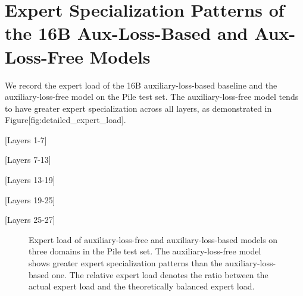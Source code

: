 \documentclass[11pt,a4paper]{article}
\begin{document}
\section{Expert Specialization Patterns of the 16B Aux-Loss-Based and Aux-Loss-Free Models}

We record the expert load of the 16B auxiliary-loss-based baseline and the auxiliary-loss-free model on the Pile test set. The auxiliary-loss-free model tends to have greater expert specialization across all layers, as demonstrated in Figure[fig:detailed\_expert\_load].

[Layers 1-7]

\begin{figure}[h]
\end{figure}

[Layers 7-13]

\begin{figure}[h]
\end{figure}

[Layers 13-19]

\begin{figure}[h]
\end{figure}

[Layers 19-25]

\begin{figure}[h]
\end{figure}

[Layers 25-27]

\begin{figure}[h]
\caption{Expert load of auxiliary-loss-free and auxiliary-loss-based models on three domains in the Pile test set. The auxiliary-loss-free model shows greater expert specialization patterns than the auxiliary-loss-based one. The relative expert load denotes the ratio between the actual expert load and the theoretically balanced expert load.}
\end{figure}
\end{document}
